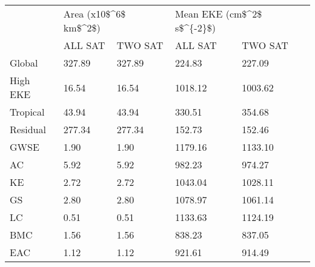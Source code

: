 \begin{tabular}{lllll}
\toprule
{} & \multicolumn{2}{l}{Area (x10\$\textasciicircum 6\$ km\$\textasciicircum 2\$)} & \multicolumn{2}{l}{Mean EKE (cm\$\textasciicircum 2\$ s\$\textasciicircum \{-2\}\$)} \\
{} &               ALL SAT & TWO SAT &                    ALL SAT & TWO SAT \\
\midrule
Global   &                327.89 &  327.89 &                     224.83 &  227.09 \\
High EKE &                 16.54 &   16.54 &                    1018.12 & 1003.62 \\
Tropical &                 43.94 &   43.94 &                     330.51 &  354.68 \\
Residual &                277.34 &  277.34 &                     152.73 &  152.46 \\
GWSE     &                  1.90 &    1.90 &                    1179.16 & 1133.10 \\
AC       &                  5.92 &    5.92 &                     982.23 &  974.27 \\
KE       &                  2.72 &    2.72 &                    1043.04 & 1028.11 \\
GS       &                  2.80 &    2.80 &                    1078.97 & 1061.14 \\
LC       &                  0.51 &    0.51 &                    1133.63 & 1124.19 \\
BMC      &                  1.56 &    1.56 &                     838.23 &  837.05 \\
EAC      &                  1.12 &    1.12 &                     921.61 &  914.49 \\
\bottomrule
\end{tabular}
